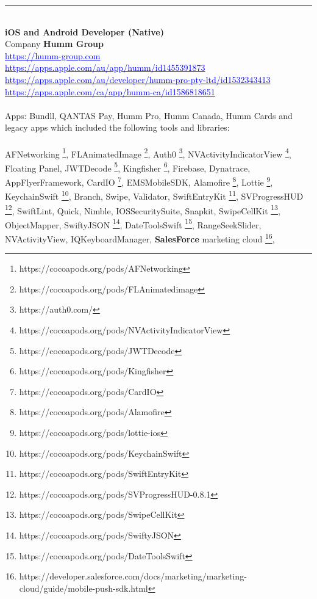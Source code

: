 \documentclass{article}
\let\svthefootnote\thefootnote
\newcommand\Cfootnote[2][black]{\def\thefootnote{\color{#1}\svthefootnote}%
  \footnote{\color{#1}#2}}
\begin{document}
\noindent\hfil\rule{0.5\textwidth}{.4pt}\hfil
\\


\textbf{ iOS and Android Developer (Native) }  \\
Company  \textbf {Humm Group}  \\
\textcolor{blue} { \underline{  https://humm-group.com  } }  \\
\textcolor{blue} { \underline{ https://apps.apple.com/au/app/humm/id1455391873  } }  \\
\textcolor{blue} { \underline{ https://apps.apple.com/au/developer/humm-pro-pty-ltd/id1532343413  } }  \\
\textcolor{blue} { \underline{ https://apps.apple.com/ca/app/humm-ca/id1586818651 } }  \\
\\
Apps: Bundll, QANTAS Pay, Humm Pro, Humm Canada, Humm Cards and legacy apps which included the following tools and libraries:\\
\\
AFNetworking\Cfootnote[blue]{\label{afnet} https://cocoapods.org/pods/AFNetworking}, FLAnimatedImage\Cfootnote[blue]{https://cocoapods.org/pods/FLAnimatedimage}, Auth0\Cfootnote[blue]{\label{auth0}https://auth0.com/}, NVActivityIndicatorView\Cfootnote[blue]{https://cocoapods.org/pods/NVActivityIndicatorView}, Floating Panel, JWTDecode\Cfootnote[blue]{https://cocoapods.org/pods/JWTDecode}, Kingfisher\Cfootnote[blue]{https://cocoapods.org/pods/Kingfisher}, Firebase, Dynatrace, AppFlyerFramework, CardIO\Cfootnote[blue]{https://cocoapods.org/pods/CardIO}, EMSMobileSDK, Alamofire\Cfootnote[blue]{https://cocoapods.org/pods/Alamofire}, Lottie\Cfootnote[blue]{https://cocoapods.org/pods/lottie-ios}, 
KeychainSwift\Cfootnote[blue]{https://cocoapods.org/pods/KeychainSwift}, Branch, Swipe, Validator, SwiftEntryKit\Cfootnote[blue]{https://cocoapods.org/pods/SwiftEntryKit}, SVProgressHUD\Cfootnote[blue]{https://cocoapods.org/pods/SVProgressHUD-0.8.1}, SwiftLint, Quick, Nimble,  IOSSecuritySuite, Snapkit, SwipeCellKit\Cfootnote[blue]{https://cocoapods.org/pods/SwipeCellKit}, ObjectMapper, SwiftyJSON\Cfootnote[blue]{https://cocoapods.org/pods/SwiftyJSON}, DateToolsSwift\Cfootnote[blue]{https://cocoapods.org/pods/DateToolsSwift}, RangeSeekSlider, NVActivityView, IQKeyboardManager, \textbf{SalesForce} marketing cloud\Cfootnote[blue]{https://developer.salesforce.com/docs/marketing/marketing-cloud/guide/mobile-push-sdk.html},   
\end{document}
